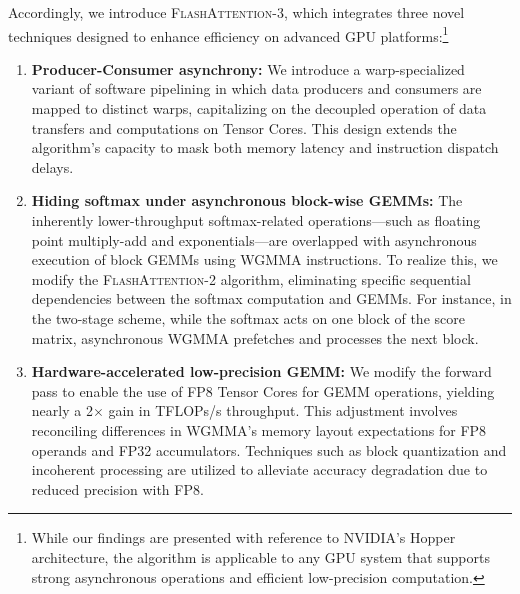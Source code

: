 Accordingly, we introduce \textsc{FlashAttention-3}, which integrates three novel techniques designed to enhance efficiency on advanced GPU platforms:\footnote{While our findings are presented with reference to NVIDIA's Hopper architecture, the algorithm is applicable to any GPU system that supports strong asynchronous operations and efficient low-precision computation.}

\begin{enumerate}

\item \textbf{Producer-Consumer asynchrony:} We introduce a warp-specialized variant of software pipelining in which data producers and consumers are mapped to distinct warps, capitalizing on the decoupled operation of data transfers and computations on Tensor Cores. This design extends the algorithm’s capacity to mask both memory latency and instruction dispatch delays.
\item \textbf{Hiding softmax under asynchronous block-wise GEMMs:} The inherently lower-throughput softmax-related operations—such as floating point multiply-add and exponentials—are overlapped with asynchronous execution of block GEMMs using WGMMA instructions. To realize this, we modify the \textsc{FlashAttention-2} algorithm, eliminating specific sequential dependencies between the softmax computation and GEMMs. For instance, in the two-stage scheme, while the softmax acts on one block of the score matrix, asynchronous WGMMA prefetches and processes the next block.
\item \textbf{Hardware-accelerated low-precision GEMM:} We modify the forward pass to enable the use of FP8 Tensor Cores for GEMM operations, yielding nearly a 2$\times$ gain in TFLOPs/s throughput. This adjustment involves reconciling differences in WGMMA’s memory layout expectations for FP8 operands and FP32 accumulators. Techniques such as block quantization and incoherent processing are utilized to alleviate accuracy degradation due to reduced precision with FP8.
\end{enumerate}


